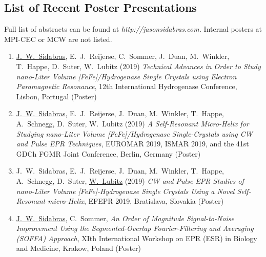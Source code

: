 \subsection*{List of Recent Poster Presentations}
Full list of abstracts can be found at \textit{http://jasonsidabras.com.} Internal posters at MPI-CEC or MCW are not listed.
\begin{enumerate}
\itemsep0em 
    \item \underline{J.~W.~Sidabras}, E.~J.~Reijerse, C.~Sommer, J.~Duan, M.~Winkler, T.~Happe, D.~Suter, W.~Lubitz (2019) \textit{Technical Advances in Order to Study nano-Liter Volume [FeFe]\-/Hydrogenase Single Crystals using Electron Paramagnetic Resonance}, 12th International Hydrogenase Conference, Lisbon, Portugal (Poster)
    \item \underline{J.~W.~Sidabras}, E.~J.~Reijerse, J.~Duan, M.~Winkler, T.~Happe, A.~Schnegg, D.~Suter, W.~Lubitz (2019) \textit{A Self-Resonant Micro-Helix for Studying nano-Liter Volume [FeFe]\-/Hydrogenase Single-Crystals using CW and Pulse EPR Techniques}, EUROMAR 2019, ISMAR 2019, and the 41st GDCh FGMR Joint Conference, Berlin, Germany (Poster)
    \item J.~W.~Sidabras, E.~J.~Reijerse, J.~Duan, M.~Winkler, T.~Happe, A.~Schnegg, D.~Suter, \underline{W.~Lubitz} (2019) \textit{CW and Pulse EPR Studies of nano-Liter Volume [FeFe]-Hydrogenase Single Crystals Using a Novel Self-Resonant micro-Helix}, EFEPR 2019, Bratislava, Slovakia (Poster)
    \item \underline{J.~W.~Sidabras}, C.~Sommer, \textit{An Order of Magnitude Signal-to-Noise Improvement Using the Segmented-Overlap Fourier-Filtering and Averaging (SOFFA) Approach}, XIth International Workshop on EPR (ESR) in Biology and Medicine, Krakow, Poland (Poster)
\end{enumerate}
